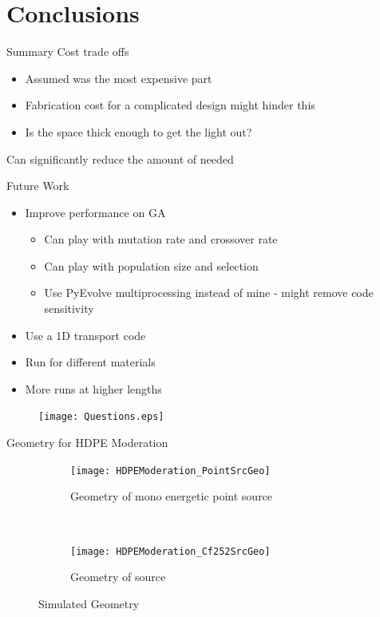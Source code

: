\documentclass[compress]{beamer}
\begin{document}
\section{Conclusions}
\begin{frame}{Summary}
Cost trade offs
\begin{itemize}
	\item Assumed  was the most expensive part
	\item Fabrication cost for a complicated design might hinder this
	\item Is the space thick enough to get the light out?
\end{itemize}
Can significantly reduce the amount of  needed
\end{frame}
\begin{frame}{Future Work}
\begin{itemize}
	\item Improve performance on GA
	\small
	\begin{itemize}
		\item Can play with mutation rate and crossover rate
		\item Can play with population size and selection
		\item Use PyEvolve multiprocessing instead of mine - might remove code sensitivity
	\end{itemize}
	\normalsize
	\item Use a 1D transport code
	\item Run for different materials
	\item More runs at higher lengths
\end{itemize}
\end{frame}
\begin{frame}
	\centering
  \begin{figure}
    \texttt{[image: Questions.eps]}
  \end{figure}
\end{frame}
%  

\begin{frame}{Geometry for HDPE Moderation}
\begin{figure}
  \begin{subfigure}[b]{0.45\textwidth}
    \centering
    \texttt{[image: HDPEModeration\_PointSrcGeo]}
    \caption{Geometry of mono energetic point source}
  \end{subfigure}%
  ~
  \begin{subfigure}[b]{0.45\textwidth}
    \centering
    \texttt{[image: HDPEModeration\_Cf252SrcGeo]}
    \caption{Geometry of  source}
  \end{subfigure}
  \caption{Simulated Geometry}
\end{figure}
\end{frame}
\end{document}
